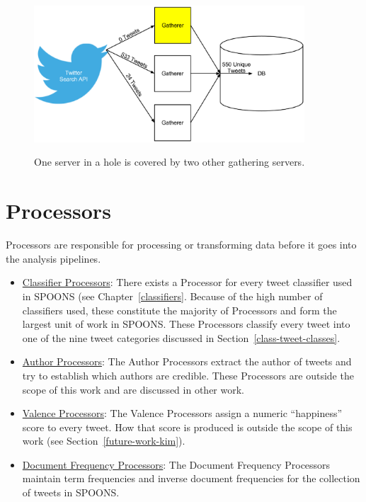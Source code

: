 \documentclass[12pt]{ucthesis}
\newcommand{\captionfonts}{\small\bf\ssp}
\begin{document}
\begin{figure}
   \begin{center}
      \includegraphics[width=0.9\textwidth]{images/Twitter_Holes.eps}
      \captionfonts
      \caption[Twitter Holes]{One server in a hole is covered by two other gathering servers.}
      \label{fig:ui}
   \end{center}
\end{figure}

\section{Processors}
\label{arch-processors}
Processors are responsible for processing or transforming data before it goes into the analysis pipelines.
\begin{itemize}
   \item{\underline{Classifier Processors}:} There exists a Processor for every tweet classifier used in SPOONS (see Chapter~\ref{classifiers}.
   Because of the high number of classifiers used, these constitute the majority of Processors and form the largest unit of work in SPOONS.
   These Processors classify every tweet into one of the nine tweet categories discussed in Section~\ref{class-tweet-classes}.

   \item{\underline{Author Processors}:} The Author Processors extract the author of tweets and try to establish which authors are credible. These Processors are
   outside the scope of this work and are discussed in other work\cite{cailinThesis}.

   \item{\underline{Valence Processors}:} The Valence Processors assign a numeric ``happiness'' score to every tweet. How that score is produced is outside the
   scope of this work (see Section~\ref{future-work-kim}).

   \item{\underline{Document Frequency Processors}:} The Document Frequency Processors maintain term frequencies and inverse document frequencies for the collection
   of tweets in SPOONS.

\end{itemize}
\end{document}
